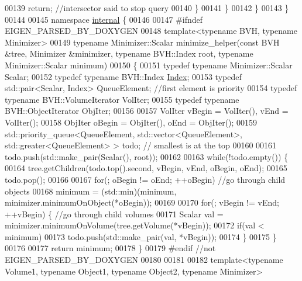\begin{DoxyCode}
00139           \textcolor{keywordflow}{return}; \textcolor{comment}{//intersector said to stop query}
00140       \}
00141     \}
00142   \}
00143 \}
00144 
00145 \textcolor{keyword}{namespace }\hyperlink{namespaceinternal}{internal} \{
00146 
00147 \textcolor{preprocessor}{#ifndef EIGEN\_PARSED\_BY\_DOXYGEN}
00148 \textcolor{keyword}{template}<\textcolor{keyword}{typename} BVH, \textcolor{keyword}{typename} Minimizer>
00149 \textcolor{keyword}{typename} Minimizer::Scalar minimize\_helper(\textcolor{keyword}{const} BVH &tree, Minimizer &minimizer, \textcolor{keyword}{typename} BVH::Index root,
       \textcolor{keyword}{typename} Minimizer::Scalar minimum)
00150 \{
00151   \textcolor{keyword}{typedef} \textcolor{keyword}{typename} Minimizer::Scalar Scalar;
00152   \textcolor{keyword}{typedef} \textcolor{keyword}{typename} BVH::Index \hyperlink{namespace_eigen_a62e77e0933482dafde8fe197d9a2cfde}{Index};
00153   \textcolor{keyword}{typedef} std::pair<Scalar, Index> QueueElement; \textcolor{comment}{//first element is priority}
00154   \textcolor{keyword}{typedef} \textcolor{keyword}{typename} BVH::VolumeIterator VolIter;
00155   \textcolor{keyword}{typedef} \textcolor{keyword}{typename} BVH::ObjectIterator ObjIter;
00156 
00157   VolIter vBegin = VolIter(), vEnd = VolIter();
00158   ObjIter oBegin = ObjIter(), oEnd = ObjIter();
00159   std::priority\_queue<QueueElement, std::vector<QueueElement>, std::greater<QueueElement> > todo; \textcolor{comment}{//
      smallest is at the top}
00160 
00161   todo.push(std::make\_pair(Scalar(), root));
00162 
00163   \textcolor{keywordflow}{while}(!todo.empty()) \{
00164     tree.getChildren(todo.top().second, vBegin, vEnd, oBegin, oEnd);
00165     todo.pop();
00166 
00167     \textcolor{keywordflow}{for}(; oBegin != oEnd; ++oBegin) \textcolor{comment}{//go through child objects}
00168       minimum = (std::min)(minimum, minimizer.minimumOnObject(*oBegin));
00169 
00170     \textcolor{keywordflow}{for}(; vBegin != vEnd; ++vBegin) \{ \textcolor{comment}{//go through child volumes}
00171       Scalar val = minimizer.minimumOnVolume(tree.getVolume(*vBegin));
00172       \textcolor{keywordflow}{if}(val < minimum)
00173         todo.push(std::make\_pair(val, *vBegin));
00174     \}
00175   \}
00176 
00177   \textcolor{keywordflow}{return} minimum;
00178 \}
00179 \textcolor{preprocessor}{#endif //not EIGEN\_PARSED\_BY\_DOXYGEN}
00180 
00181 
00182 \textcolor{keyword}{template}<\textcolor{keyword}{typename} Volume1, \textcolor{keyword}{typename} Object1, \textcolor{keyword}{typename} Object2, \textcolor{keyword}{typename} Minimizer>

\end{DoxyCode}
